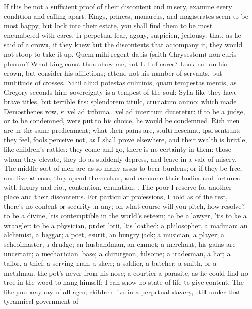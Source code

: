 {If this be not a sufficient proof of their discontent and misery,
examine every condition and calling apart. Kings, princes, monarchs,
and magistrates seem to be most happy, but look into their estate, you
shall find them to be most encumbered with cares, in perpetual
fear, agony, suspicion, jealousy: that, as he said of a crown, if
they knew but the discontents that accompany it, they would not stoop
to take it up. Quem mihi regent dabis (saith Chrysostom) non curis
plenum? What king canst thou show me, not full of cares? Look not
on his crown, but consider his afflictions; attend not his number of
servants, but multitude of crosses. Nihil aliud potestas culminis, quam
tempestas mentis, as Gregory seconds him; sovereignty is a tempest of
the soul: Sylla like they have brave titles, but terrible fits:
splendorem titulo, cruciatum animo: which made Demosthenes vow,
si vel ad tribunal, vel ad interitum duceretur: if to be a judge, or to
be condemned, were put to his choice, he would be condemned. Rich men
are in the same predicament; what their pains are, stulti nesciunt,
ipsi sentiunt: they feel, fools perceive not, as I shall prove
elsewhere, and their wealth is brittle, like children's rattles: they
come and go, there is no certainty in them: those whom they elevate,
they do as suddenly depress, and leave in a vale of misery. The middle
sort of men are as so many asses to bear burdens; or if they be free,
and live at ease, they spend themselves, and consume their bodies and
fortunes with luxury and riot, contention, emulation, \etc{}. The poor I
reserve for another place and their discontents.
For particular professions, I hold as of the rest, there's no content
or security in any; on what course will you pitch, how resolve? to be a
divine, 'tis contemptible in the world's esteem; to be a lawyer, 'tis
to be a wrangler; to be a physician, pudet lotii, 'tis loathed; a
philosopher, a madman; an alchemist, a beggar; a poet, esurit, an
hungry jack; a musician, a player; a schoolmaster, a drudge; an
husbandman, an emmet; a merchant, his gains are uncertain; a
mechanician, base; a chirurgeon, fulsome; a tradesman, a liar; a
tailor, a thief; a serving-man, a slave; a soldier, a butcher; a smith,
or a metalman, the pot's never from his nose; a courtier a parasite, as
he could find no tree in the wood to hang himself; I can show no state
of life to give content. The like you may say of all ages; children
live in a perpetual slavery, still under that tyrannical government of
}
